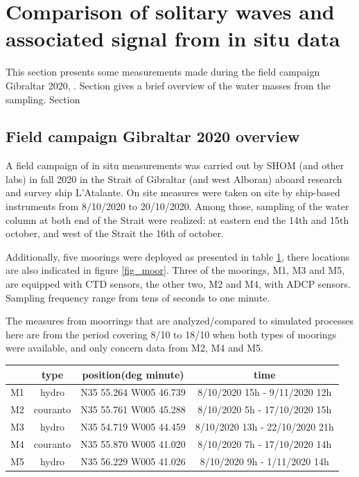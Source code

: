 \hypersetup{pdfborder=0 0 0}


\section{Comparison of solitary waves and associated signal from in situ data}
\label{sectionCampagne}

This section presents some measurements made during the field campaign Gibraltar 2020, .     Section gives a brief overview of the water masses from the sampling. Section

\subsection{Field campaign Gibraltar 2020 overview}
A field campaign of in situ measurements was carried out by SHOM (and other labs) in fall 2020 in the Strait of Gibraltar (and west Alboran) aboard research and survey ship L'Atalante. On site measures were taken on site by ship-based instruments from 8/10/2020 to 20/10/2020. Among those, sampling of the water column at both end of the Strait were realized: at eastern end the 14th and 15th october, and west of the Strait the 16th of october.

Additionally, five moorings were deployed as presented in table \ref{tab_moor}, there locations are also indicated in figure \ref{fig_moor}. Three of the moorings, M1, M3 and M5, are equipped with CTD sensors, the other two, M2 and M4, with ADCP sensors. Sampling frequency range from tens of seconds to one minute.

The measures from moorrings that are analyzed/compared to simulated processes here are from the period covering 8/10 to 18/10 when both types of moorings were available, and only concern data from M2, M4 and M5.


\begin{table}[!h]
        \centering
        \begin{tabular}{|c|c|c|c|}
                \hline
                 & type & position(deg minute) & time \\ 
                 \hline
                M1 & hydro & N35 55.264 W005 46.739 & 8/10/2020 15h - 9/11/2020 12h\\
                M2 & couranto & N35 55.761 W005 45.288 & 8/10/2020 5h - 17/10/2020 15h\\
                M3 & hydro & N35 54.719 W005 44.459 & 8/10/2020 13h - 22/10/2020 21h\\
                M4 & couranto & N35 55.870 W005 41.020 & 8/10/2020 7h - 17/10/2020 14h\\
                M5 & hydro & N35 56.229 W005 41.026 & 8/10/2020 9h - 1/11/2020 14h\\
                \hline
        \end{tabular}
        \label{tab_moor}
\end{table}


